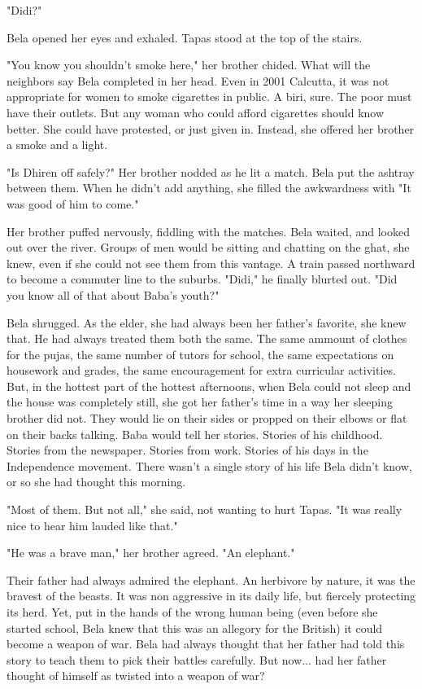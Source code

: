\documentclass{amsart}
\begin{document}
"Didi?" 

Bela opened her eyes and exhaled. Tapas stood at the top of the stairs.

"You know you shouldn't smoke here," her brother chided. What will the neighbors say Bela completed in her head. Even in 2001 Calcutta, it was not appropriate for women to smoke cigarettes in public. A biri, sure. The poor must have their outlets. But any woman who could afford cigarettes should know better. She could have protested, or just given in. Instead, she offered her brother a smoke and a light.

"Is Dhiren off safely?" Her brother nodded as he lit a match. Bela put the ashtray between them. When he didn't add anything, she filled the awkwardness with "It was good of him to come."

Her brother puffed nervously, fiddling with the matches. Bela waited, and looked out over the river. Groups of men would be sitting and chatting on the ghat, she knew, even if she could not see them from this vantage. A train passed northward to become a commuter line to the suburbs. "Didi," he finally blurted out. "Did you know all of that about Baba's youth?"

Bela shrugged. As the elder, she had always been her father's favorite, she knew that. He had always treated them both the same. The same ammount of clothes for the pujas, the same number of tutors for school, the same expectations on housework and grades, the same encouragement for extra curricular activities. But, in the hottest part of the hottest afternoons, when Bela could not sleep and the house was completely still, she got her father's time in a way her sleeping brother did not. They would lie on their sides or propped on their elbows or flat on their backs talking. Baba would tell her stories. Stories of his childhood. Stories from the newspaper. Stories from work. Stories of his days in the Independence movement. There wasn't a single story of his life Bela didn't know, or so she had thought this morning.

"Most of them. But not all," she said, not wanting to hurt Tapas. "It was really nice to hear him lauded like that." 

"He was a brave man," her brother agreed. "An elephant."

Their father had always admired the elephant. An herbivore by nature, it was the bravest of the beasts. It was non aggressive in its daily life, but fiercely protecting its herd. Yet, put in the hands of the wrong human being (even before she started school, Bela knew that this was an allegory for the British) it could become a weapon of war. Bela had always thought that her father had told this story to teach them to pick their battles carefully. But now... had her father thought of himself as twisted into a weapon of war?
\end{document}
